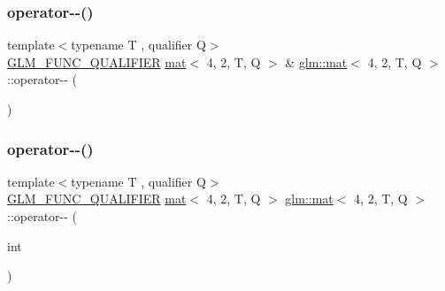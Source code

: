 \subsubsection{\texorpdfstring{operator-\/-\/()}{operator--()}\hspace{0.1cm}{\footnotesize\ttfamily [1/2]}}
{\footnotesize\ttfamily template$<$typename T , qualifier Q$>$ \\
\hyperlink{setup_8hpp_a33fdea6f91c5f834105f7415e2a64407}{G\+L\+M\+\_\+\+F\+U\+N\+C\+\_\+\+Q\+U\+A\+L\+I\+F\+I\+ER} \hyperlink{structglm_1_1mat}{mat}$<$ 4, 2, T, Q $>$ \& \hyperlink{structglm_1_1mat}{glm\+::mat}$<$ 4, 2, T, Q $>$\+::operator-\/-\/ (\begin{DoxyParamCaption}{ }\end{DoxyParamCaption})}

\mbox{\label{structglm_1_1mat_3_014_00_012_00_01_t_00_01_q_01_4_a3fb0499b3c4e78d4d52ad9ee06146c06}} 
\subsubsection{\texorpdfstring{operator-\/-\/()}{operator--()}\hspace{0.1cm}{\footnotesize\ttfamily [2/2]}}
{\footnotesize\ttfamily template$<$typename T , qualifier Q$>$ \\
\hyperlink{setup_8hpp_a33fdea6f91c5f834105f7415e2a64407}{G\+L\+M\+\_\+\+F\+U\+N\+C\+\_\+\+Q\+U\+A\+L\+I\+F\+I\+ER} \hyperlink{structglm_1_1mat}{mat}$<$ 4, 2, T, Q $>$ \hyperlink{structglm_1_1mat}{glm\+::mat}$<$ 4, 2, T, Q $>$\+::operator-\/-\/ (\begin{DoxyParamCaption}\item[{int}]{ }\end{DoxyParamCaption})}

\mbox{\label{structglm_1_1mat_3_014_00_012_00_01_t_00_01_q_01_4_a2154501995309db9c93fb4972f39f17c}} 

